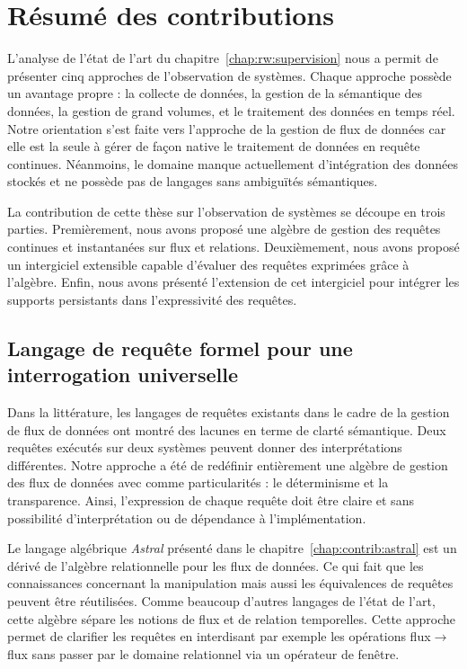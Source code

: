 \section{Résumé des contributions}\label{sec:conclusion:contributions}
L'analyse de l'état de l'art du chapitre~\ref{chap:rw:supervision} nous a permit de présenter cinq approches de l'observation de systèmes. Chaque approche possède un avantage propre : la collecte de données, la gestion de la sémantique des données, la gestion de grand volumes, et le traitement des données en temps réel. Notre orientation s'est faite vers l'approche de la gestion de flux de données car elle est la seule à gérer de façon native le traitement de données en requête continues. Néanmoins, le domaine manque actuellement d'intégration des données stockés et ne possède pas de langages sans ambiguïtés sémantiques.

La contribution de cette thèse sur l'observation de systèmes se découpe en trois parties. Premièrement, nous avons proposé une algèbre de gestion des requêtes continues et instantanées sur flux et relations. Deuxièmement, nous avons proposé un intergiciel extensible capable d'évaluer des requêtes exprimées grâce à l'algèbre. Enfin, nous avons présenté l'extension de cet intergiciel pour intégrer les supports persistants dans l'expressivité des requêtes.

\subsection{Langage de requête formel pour une interrogation universelle}
Dans la littérature, les langages de requêtes existants dans le cadre de la gestion de flux de données ont montré des lacunes en terme de clarté sémantique. Deux requêtes exécutés sur deux systèmes peuvent donner des interprétations différentes. Notre approche a été de redéfinir entièrement une algèbre de gestion des flux de données avec comme particularités : le déterminisme et la transparence. Ainsi, l'expression de chaque requête doit être claire et sans possibilité d'interprétation ou de dépendance à l'implémentation.

Le langage algébrique \textit{Astral} présenté dans le chapitre~\ref{chap:contrib:astral} est un dérivé de l'algèbre relationnelle pour les flux de données. Ce qui fait que les connaissances concernant la manipulation mais aussi les équivalences de requêtes peuvent être réutilisées. Comme beaucoup d'autres langages de l'état de l'art, cette algèbre sépare les notions de flux et de relation temporelles. Cette approche permet de clarifier les requêtes en interdisant par exemple les opérations flux$\to$flux sans passer par le domaine relationnel via un opérateur de fenêtre.

